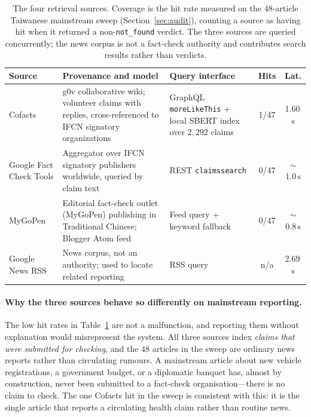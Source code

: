 \documentclass[twoside]{llncs}
\begin{document}
\begin{table}[!htbp]
\caption{The four retrieval sources. Coverage is the hit rate measured on the $48$-article Taiwanese mainstream sweep (Section~\ref{sec:audit}), counting a source as having hit when it returned a non-\texttt{not\_found} verdict. The three sources are queried concurrently; the news corpus is not a fact-check authority and contributes search results rather than verdicts.}
\label{tab:sources}
\centering
\small
\begin{tabular}{>{\raggedright\arraybackslash}p{2.05cm} >{\raggedright\arraybackslash}p{3.0cm} >{\raggedright\arraybackslash}p{2.0cm}cc}
\toprule
\textbf{Source} & \textbf{Provenance and model} & \textbf{Query interface} & \textbf{Hits} & \textbf{Lat.} \\
\midrule
Cofacts & g0v collaborative wiki; volunteer claims with replies, cross-referenced to IFCN signatory organizations & GraphQL \texttt{moreLikeThis} + local SBERT index over $2{,}292$ claims & 1/47 & 1.60\,s \\
Google Fact Check Tools & Aggregator over IFCN signatory publishers worldwide, queried by claim text & REST \texttt{claims\allowbreak search} & 0/47 & $\sim$1.0\,s \\
MyGoPen & Editorial fact-check outlet (MyGoPen) publishing in Traditional Chinese; Blogger Atom feed & Feed query + keyword fallback & 0/47 & $\sim$0.8\,s \\
Google News RSS & News corpus, not an authority; used to locate related reporting & RSS query & n/a & 2.69\,s \\
\bottomrule
\end{tabular}
\end{table}

\paragraph{Why the three sources behave so differently on mainstream reporting.}
The low hit rates in Table~\ref{tab:sources} are not a malfunction, and reporting them without explanation would misrepresent the system. All three sources index \emph{claims that were submitted for checking}, and the $48$ articles in the sweep are ordinary news reports rather than circulating rumours. A mainstream article about new vehicle registrations, a government budget, or a diplomatic banquet has, almost by construction, never been submitted to a fact-check organisation---there is no claim to check. The one Cofacts hit in the sweep is consistent with this: it is the single article that reports a circulating health claim rather than routine news.
\end{document}
